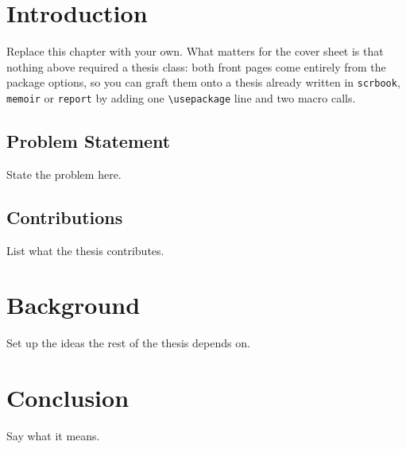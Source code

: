 \documentclass[11pt,a4paper,oneside]{report}
\begin{document}
\Titelblatt

%
\Versicherung

\tableofcontents

\chapter{Introduction}

Replace this chapter with your own. What matters for the cover sheet is that
nothing above required a thesis class: both front pages come entirely from
the package options, so you can graft them onto a thesis already written in
\texttt{scrbook}, \texttt{memoir} or \texttt{report} by adding one
\verb|\usepackage| line and two macro calls.

\section{Problem Statement}

State the problem here.

\section{Contributions}

List what the thesis contributes.

\chapter{Background}

Set up the ideas the rest of the thesis depends on.

\chapter{Conclusion}

Say what it means.
\end{document}
